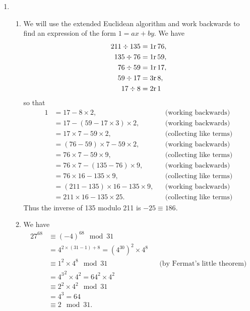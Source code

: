 \documentclass[a4paper]{article}
\begin{document}
\begin{enumerate}
		\item
		\begin{enumerate}
			\item We will use the extended Euclidean algorithm and work backwards to find an expression of the form $1 = a x + b y$. We have
			\begin{align*}
				211 \div 135 &= 1 \text r \, 76, \\
				135 \div 76 &= 1 \text r \, 59, \\
				76 \div 59 &= 1 \text r \, 17, \\
				59 \div 17 &= 3 \text r \, 8, \\
				17 \div 8 &= 2 \text r \, 1
			\end{align*}
			so that
			\begin{align*}
				1 &= 17 - 8 \times 2, && \text{(working backwards)} \\
				  &= 17 - (59 - 17 \times 3) \times 2, && \text{(working backwards)} \\
				  &= 17 \times 7 - 59 \times 2, && \text{(collecting like terms)} \\
				  &= (76 - 59) \times 7 - 59 \times 2, && \text{(working backwards)} \\
				  &= 76 \times 7 - 59 \times 9, && \text{(collecting like terms)} \\
				  &= 76 \times 7 - (135 - 76) \times 9, && \text{(working backwards)} \\
				  &= 76 \times 16 - 135 \times 9, && \text{(collecting like terms)} \\
				  &= (211 - 135) \times 16 - 135 \times 9, && \text{(working backwards)} \\
				  &= 211 \times 16 - 135 \times 25. && \text{(collecting like terms)}
			\end{align*}
			Thus the inverse of 135 modulo 211 is $- 25 \equiv 186$.
			
			\item We have
			\begin{align*}
				27^{68} & \equiv (- 4)^{68} \mod{31} \\
				& = 4^{2 \times (31 - 1) + 8} = (4^{30})^2 \times 4^8 \\
				& \equiv 1^2 \times 4^8 \mod{31}  && \text{(by Fermat's little theorem)} \\
				& = {4^{3}}^2 \times 4^{2} = {64}^2 \times 4^{2}\\
				& \equiv {2}^2 \times 4^{2} \mod{31} \\
				& = 4^3 = 64 \\
				& \equiv 2 \mod{31}.
			\end{align*}
			

\end{enumerate}
\end{enumerate}
\end{document}
